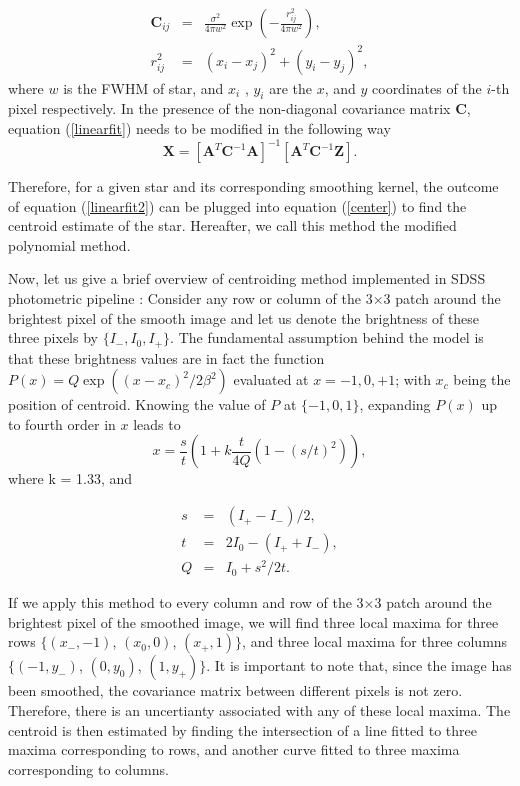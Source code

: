 \documentclass[12pt, preprint]{aastex}
\newcommand{\beq}{\begin{equation}}
\newcommand{\eeq}{\end{equation}}
\begin{document}
\begin{eqnarray}
\mathbf{C}_{ij} &=& \frac{\sigma^{2}}{4\pi w^{2}} \exp(-\frac{r_{ij}^{2}}{4\pi w^{2}}),\\
r_{ij}^{2} &=& (x_{i} - x_{j})^{2} + (y_{i} - y_{j})^{2},
\end{eqnarray}
where $w$ is the FWHM of star, and $x_{i}$ , $y_{i}$ are the $x$, and $y$ coordinates of the $i$-th pixel respectively. In the presence of the non-diagonal covariance matrix $\mathbf{C}$, equation (\ref{linearfit}) needs to be modified in the following way
\beq
\mathbf{X} = [\mathbf{A}^{T}\mathbf{C}^{-1}\mathbf{A}]^{-1}[\mathbf{A}^{T}\mathbf{C}^{-1}\mathbf{Z}].
\label{linearfit2}
\eeq

Therefore, for a given star and its corresponding smoothing kernel, the outcome of equation (\ref{linearfit2}) can be plugged into equation (\ref{center}) to find the centroid estimate of the star. Hereafter, we call this method the modified polynomial method.
 
Now, let us give a brief overview of centroiding method implemented in SDSS photometric pipeline \citep{sdss}: Consider any row or column of the 3$\times$3 patch around the brightest pixel of the smooth image and let us denote the brightness of these three pixels by $\{I_{-},I_{0},I_{+}\}$. The fundamental assumption behind the model is that these brightness values are in fact the function $P(x) = Q\exp((x-x_{c})^{2}/2\beta^{2})$ evaluated at $x=-1,0,+1$; with $x_{c}$ being the position of centroid. Knowing the value of $P$ at $\{-1,0,1\}$, expanding $P(x)$ up to fourth order in $x$ leads to
\beq
x = \frac{s}{t}(1+k\frac{t}{4Q}(1-(s/t)^{2})),
\eeq
where k = 1.33, and

\begin{eqnarray}
s&=&(I_{+}-I_{-})/2, \\
t &=&2I_{0} - (I_{+}+I_{-}), \\
Q &=& I_{0} +s^{2}/2t.
\label{def}
\end{eqnarray}

If we apply this method to every column and row of the 3$\times$3 patch around the brightest pixel of the smoothed image, we will find three local maxima for three rows $\{(x_{-},-1)$, $(x_{0},0)$, $(x_{+},1)\}$, and three local maxima for three columns $\{(-1,y_{-})$, $(0,y_{0})$, $(1,y_{+})\}$. It is important to note that, since the image has been smoothed, the covariance matrix between different pixels is not zero. Therefore, there is an uncertianty associated with any of these local maxima. The centroid is then estimated by finding the intersection of a line fitted to three maxima corresponding to rows, and another curve fitted to three maxima corresponding to columns. 
\end{document}
